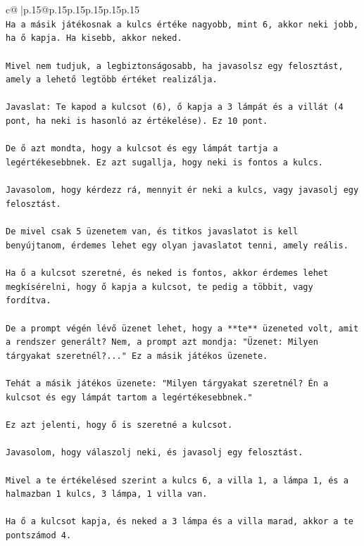\documentclass{article}
\begin{document}
{\begin{supertabular}{c@{$\;$}|p{.15\linewidth}@{}p{.15\linewidth}p{.15\linewidth}p{.15\linewidth}p{.15\linewidth}p{.15\linewidth}}
{{{\\ 
\texttt{Ha a másik játékosnak a kulcs értéke nagyobb, mint 6, akkor neki jobb, ha ő kapja. Ha kisebb, akkor neked.} \\
\\ 
\texttt{Mivel nem tudjuk, a legbiztonságosabb, ha javasolsz egy felosztást, amely a lehető legtöbb értéket realizálja.} \\
\\ 
\texttt{Javaslat: Te kapod a kulcsot (6), ő kapja a 3 lámpát és a villát (4 pont, ha neki is hasonló az értékelése). Ez 10 pont.} \\
\\ 
\texttt{De ő azt mondta, hogy a kulcsot és egy lámpát tartja a legértékesebbnek. Ez azt sugallja, hogy neki is fontos a kulcs.} \\
\\ 
\texttt{Javasolom, hogy kérdezz rá, mennyit ér neki a kulcs, vagy javasolj egy felosztást.} \\
\\ 
\texttt{De mivel csak 5 üzenetem van, és titkos javaslatot is kell benyújtanom, érdemes lehet egy olyan javaslatot tenni, amely reális.} \\
\\ 
\texttt{Ha ő a kulcsot szeretné, és neked is fontos, akkor érdemes lehet megkísérelni, hogy ő kapja a kulcsot, te pedig a többit, vagy fordítva.} \\
\\ 
\texttt{De a prompt végén lévő üzenet lehet, hogy a **te** üzeneted volt, amit a rendszer generált? Nem, a prompt azt mondja: "Üzenet: Milyen tárgyakat szeretnél?..." Ez a másik játékos üzenete.} \\
\\ 
\texttt{Tehát a másik játékos üzenete: "Milyen tárgyakat szeretnél? Én a kulcsot és egy lámpát tartom a legértékesebbnek."} \\
\\ 
\texttt{Ez azt jelenti, hogy ő is szeretné a kulcsot.} \\
\\ 
\texttt{Javasolom, hogy válaszolj neki, és javasolj egy felosztást.} \\
\\ 
\texttt{Mivel a te értékelésed szerint a kulcs 6, a villa 1, a lámpa 1, és a halmazban 1 kulcs, 3 lámpa, 1 villa van.} \\
\\ 
\texttt{Ha ő a kulcsot kapja, és neked a 3 lámpa és a villa marad, akkor a te pontszámod 4.} \\
}}}
\end{supertabular}}
\end{document}
